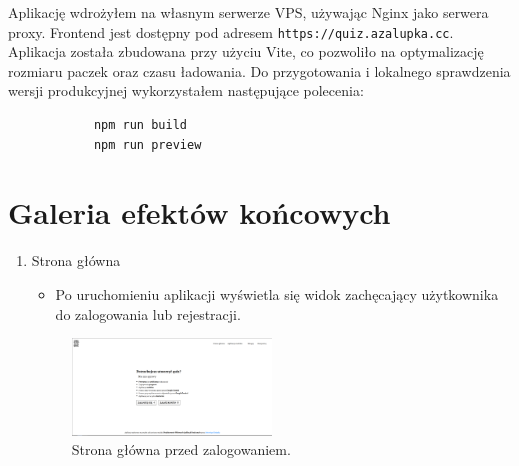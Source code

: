 \documentclass{article}
\begin{document}
        Aplikację wdrożyłem na własnym serwerze VPS, używając Nginx jako serwera proxy. Frontend jest dostępny pod adresem \texttt{https://quiz.azalupka.cc}. Aplikacja została zbudowana przy użyciu Vite, co pozwoliło na optymalizację rozmiaru paczek oraz czasu ładowania. Do przygotowania i lokalnego sprawdzenia wersji produkcyjnej wykorzystałem następujące polecenia:

        \begin{verbatim}
            npm run build
            npm run preview
        \end{verbatim}

    \section{Galeria efektów końcowych}
      \begin{enumerate}

        \item Strona główna \\
        \begin{minipage}{0.4\textwidth}
          \begin{itemize}
            \item Po uruchomieniu aplikacji wyświetla się widok zachęcający użytkownika do zalogowania lub rejestracji.
          \end{itemize}
        \end{minipage}
        \begin{minipage}{0.6\textwidth}
          \begin{figure}[H]
            \centering
            \includegraphics[width=0.5\textwidth]{../_assets/web/index.png}
            \caption{Strona główna przed zalogowaniem.}
            \label{fig:index}
          \end{figure}
        \end{minipage}


\end{enumerate}
\end{document}
